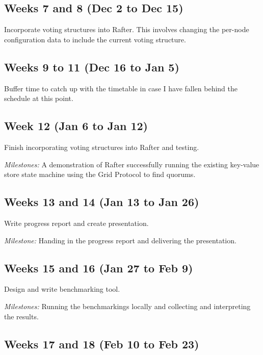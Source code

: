 \documentclass[12pt]{scrartcl}
\begin{document}
\subsection{Weeks 7 and 8 (Dec 2 to Dec 15)%
  \label{weeks-7-and-8-dec-2-to-dec-15}%
}

Incorporate voting structures into Rafter. This involves changing the per-node configuration data to include the current voting structure.

\subsection{Weeks 9 to 11 (Dec 16 to Jan 5)%
  \label{weeks-9-to-11-dec-16-to-jan-5}%
}
Buffer time to catch up with the timetable in case I have fallen behind the schedule at this point.

\subsection{Week 12 (Jan 6 to Jan 12)%
  \label{week-12-jan-6-to-jan-12}%
}

Finish incorporating voting structures into Rafter and testing.

\emph{Milestones:} A demonstration of Rafter successfully running the existing key-value store state machine using the Grid Protocol to find quorums.

\subsection{Weeks 13 and 14 (Jan 13 to Jan 26)%
  \label{weeks-13-and-14-jan-13-to-jan-26}%
}

Write progress report and create presentation.

\emph{Milestone:} Handing in the progress report and delivering the presentation.

\subsection{Weeks 15 and 16 (Jan 27 to Feb 9)%
  \label{weeks-15-and-16-jan-27-to-feb-9}%
}

Design and write benchmarking tool.

\emph{Milestones:} Running the benchmarkings locally and collecting and interpreting the results.

\subsection{Weeks 17 and 18 (Feb 10 to Feb 23)%
  \label{weeks-17-and-18-feb-10-to-feb-23}%
}
\end{document}
